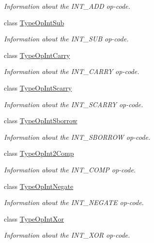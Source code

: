 \begin{DoxyCompactItemize}
\begin{DoxyCompactList}\small\item\em Information about the I\+N\+T\+\_\+\+A\+DD op-\/code. \end{DoxyCompactList}\item 
class \mbox{\hyperlink{class_type_op_int_sub}{Type\+Op\+Int\+Sub}}
\begin{DoxyCompactList}\small\item\em Information about the I\+N\+T\+\_\+\+S\+UB op-\/code. \end{DoxyCompactList}\item 
class \mbox{\hyperlink{class_type_op_int_carry}{Type\+Op\+Int\+Carry}}
\begin{DoxyCompactList}\small\item\em Information about the I\+N\+T\+\_\+\+C\+A\+R\+RY op-\/code. \end{DoxyCompactList}\item 
class \mbox{\hyperlink{class_type_op_int_scarry}{Type\+Op\+Int\+Scarry}}
\begin{DoxyCompactList}\small\item\em Information about the I\+N\+T\+\_\+\+S\+C\+A\+R\+RY op-\/code. \end{DoxyCompactList}\item 
class \mbox{\hyperlink{class_type_op_int_sborrow}{Type\+Op\+Int\+Sborrow}}
\begin{DoxyCompactList}\small\item\em Information about the I\+N\+T\+\_\+\+S\+B\+O\+R\+R\+OW op-\/code. \end{DoxyCompactList}\item 
class \mbox{\hyperlink{class_type_op_int2_comp}{Type\+Op\+Int2\+Comp}}
\begin{DoxyCompactList}\small\item\em Information about the I\+N\+T\+\_\+C\+O\+MP op-\/code. \end{DoxyCompactList}\item 
class \mbox{\hyperlink{class_type_op_int_negate}{Type\+Op\+Int\+Negate}}
\begin{DoxyCompactList}\small\item\em Information about the I\+N\+T\+\_\+\+N\+E\+G\+A\+TE op-\/code. \end{DoxyCompactList}\item 
class \mbox{\hyperlink{class_type_op_int_xor}{Type\+Op\+Int\+Xor}}
\begin{DoxyCompactList}\small\item\em Information about the I\+N\+T\+\_\+\+X\+OR op-\/code. \end{DoxyCompactList}\item 

\end{DoxyCompactItemize}
